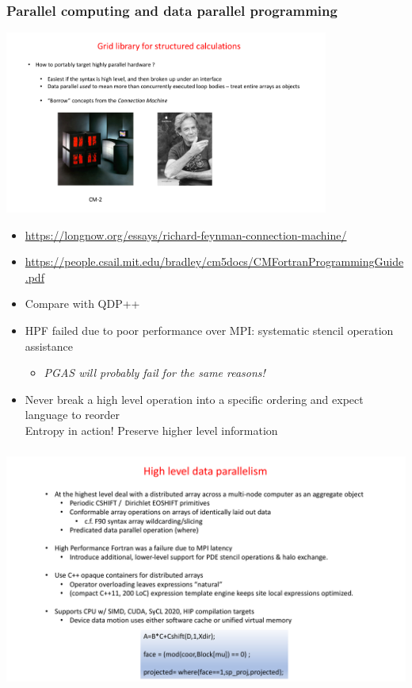 \documentclass[pdf,ps,8pt]{beamer}
\newcommand{\link}[1]{\href{#1}{ {\color{blue} #1} }}
\begin{document}
\begin{frame}[fragile]\small\frametitle{ Parallel computing and data parallel programming}

\includegraphics[width=0.8\textwidth]{CMfortran.pdf}

\begin{itemize}
  \item \link{https://longnow.org/essays/richard-feynman-connection-machine/}
  \item \link{https://people.csail.mit.edu/bradley/cm5docs/CMFortranProgrammingGuide.pdf}
  \item Compare with QDP++
  \item HPF failed due to poor performance over MPI: {\color{red}systematic stencil operation assistance}
\begin{itemize}
  \item \emph{PGAS will probably fail for the same reasons!}
\end{itemize}
\item Never break a high level operation into a specific ordering and expect language to reorder \\
      Entropy in action! Preserve higher level information
\end{itemize}
\end{frame}

\begin{frame}[fragile]\small\frametitle{ }
\includegraphics[width=\textwidth]{DPexample.pdf}
\end{frame}
\end{document}
